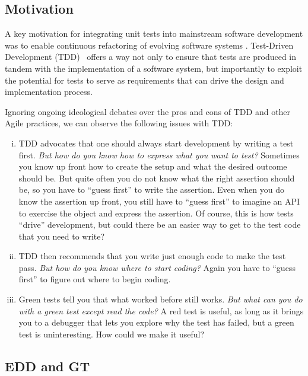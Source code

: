 \documentclass[acmsmall,screen,authorversion,nonacm]{acmart} %
\begin{document}
\subsection{Motivation}

A key motivation for integrating unit tests into mainstream software development was to enable continuous refactoring of evolving software systems \cite{Beck00a}.
Test-Driven Development (TDD)~\cite{Beck03a} offers a way not only to ensure that tests are produced in tandem with the implementation of a software system, but importantly to exploit the potential for tests to serve as requirements that can drive the design and implementation process.

Ignoring ongoing ideological debates over the pros and cons of TDD and other Agile practices, we can observe the following issues with TDD:
\begin{enumerate}[(i)]
	\item TDD advocates that one should always start development by writing a test first.
\emph{But how do you know how to express what you want to test?}
Sometimes you know up front how to create the setup and what the desired outcome should be.
But quite often you do not know what the right assertion should be, so you have to ``guess first'' to write the assertion.
Even when you do know the assertion up front, you still have to ``guess first'' to imagine an API to exercise the object and express the assertion.
Of course, this is how tests ``drive'' development, but could there be an easier way to get to the test code that you need to write?
	\item TDD then recommends that you write just enough code to make the test pass.
\emph{But how do you know where to start coding?}
Again you have to ``guess first'' to figure out where to begin coding.
	\item Green tests tell you that what worked before still works.
\emph{But what can you do with a green test except read the code?}
A red test is useful, as long as it brings you to a debugger that lets you explore why the test has failed, but a green test is uninteresting.
How could we make it useful?
\end{enumerate}

\subsection{EDD and GT}
\end{document}
